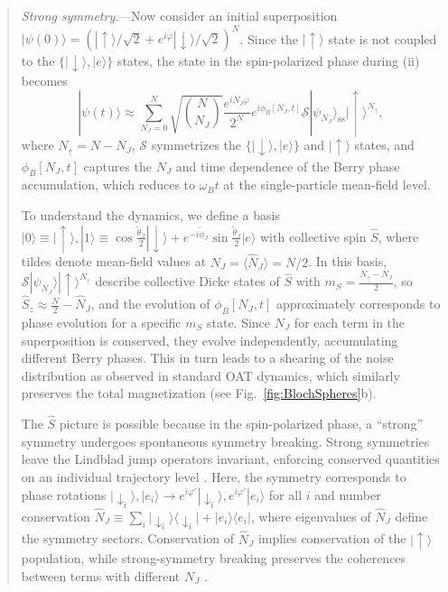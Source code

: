 \begin{abstract}
\emph{Strong symmetry}.---Now consider an initial superposition $|\psi(0)\rangle = ( |{\uparrow}\rangle/\sqrt{2} + e^{i \varphi} |{\downarrow}\rangle/\sqrt{2})^N$. Since the $|{\uparrow}\rangle$ state is not coupled to the $\{|{\downarrow}\rangle, |e\rangle \}$ states, the state in the spin-polarized phase during (ii) becomes
\begin{equation}
\label{eq:steadypsi}
 |\psi(t) \rangle \approx \sum_{N_J = 0}^N \sqrt{\binom{N}{N_J}} \frac{ e^{i N_J \varphi}}{2^N}  e^{i \phi_B[N_J,t]} \mathcal{S}|\psi_{N_J} \rangle_\text{ss} |{\uparrow}\rangle^{N_{\uparrow}}, 
\end{equation} 
where $N_{\uparrow} = N - N_J$, $\mathcal{S}$ symmetrizes the $\{|{\downarrow}\rangle, |e\rangle \}$ and $|{\uparrow}\rangle$ states, and $\phi_B[N_J,t]$ captures the $N_J$ and time dependence of the Berry phase accumulation, which reduces to $\omega_B t$ at the single-particle mean-field level. 

To understand the dynamics, we define a basis $|0\rangle \equiv |{\uparrow} \rangle, |1 \rangle \equiv \cos \frac{\tilde{\theta}_J}{2} |{\downarrow} \rangle + e^{-i \tilde{\phi}_J} \sin \frac{\tilde{\theta}_J}{2} |e\rangle$ with collective spin $\hat S$, where tildes denote mean-field values at $N_J = \langle \hat N_J \rangle = N/2$. In this basis, $ \mathcal{S}|\psi_{N_J} \rangle |{\uparrow}\rangle^{N_{\uparrow}}$ describe collective Dicke states of $\hat S$ with $m_S = \frac{N_{\uparrow} - N_J}{2}$, so $\hat S_z \approx \frac{N}{2} - \hat N_J$, and the evolution of $\phi_B[N_J,t]$ approximately corresponds to phase evolution for a specific $m_S$ state. Since $N_J$ for each term in the superposition is conserved, they
evolve independently, accumulating different Berry phases. This in turn leads to a shearing of the noise distribution as observed in standard OAT dynamics, which similarly preserves the total magnetization (see Fig.~\ref{fig:BlochSpheres}b).

The $\hat S$ picture is possible because in the spin-polarized phase, a ``strong'' symmetry \cite{Buca2012} undergoes spontaneous symmetry breaking.
Strong symmetries leave the Lindblad jump operators invariant, enforcing conserved quantities on an individual trajectory level \cite{Buca2012, SanchezMunoz2019, Lieu2020, Dutta2020,suppcite,Albert2014, Manzano2018,Zhang2024, Li2023,Liu2023,Ma2023a, Ma2023b, Minganti2023}. Here, the symmetry corresponds to phase rotations $|{\downarrow}_i\rangle, |e_i\rangle \to e^{i \varphi'} |{\downarrow}_i\rangle, e^{i \varphi'} |e_{i}\rangle$ for all $i$ and number conservation $\hat N_J \equiv \sum_i |{\downarrow}_{i} \rangle \langle {\downarrow}_{i}| + |e_{i} \rangle \langle e_{i}|$, where eigenvalues of $\hat N_J$ define the symmetry sectors. Conservation of $\hat N_J$ implies conservation of the $|{\uparrow}\rangle$ population, while strong-symmetry breaking preserves the coherences between terms with different $N_J$ \cite{Lieu2020,Liu2023}.


\end{abstract}
